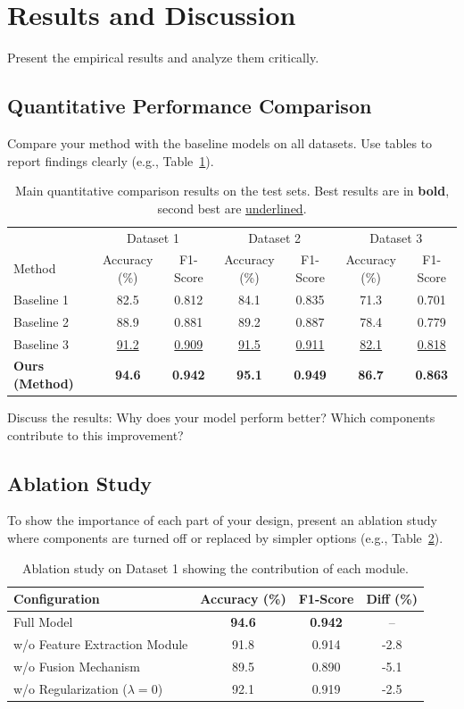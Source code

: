 \section{Results and Discussion}\label{sec:results}
Present the empirical results and analyze them critically.

\subsection{Quantitative Performance Comparison}
Compare your method with the baseline models on all datasets. Use tables to report findings clearly (e.g., Table~\ref{tab:main_results}).

\begin{table}[h]
\caption{Main quantitative comparison results on the test sets. Best results are in \textbf{bold}, second best are \underline{underlined}.}\label{tab:main_results}
\begin{tabular}{@{}lcccccc@{}}
\toprule
 & \multicolumn{2}{c}{Dataset 1} & \multicolumn{2}{c}{Dataset 2} & \multicolumn{2}{c}{Dataset 3} \\
Method & Accuracy (\%) & F1-Score & Accuracy (\%) & F1-Score & Accuracy (\%) & F1-Score \\
\midrule
Baseline 1 & 82.5 & 0.812 & 84.1 & 0.835 & 71.3 & 0.701 \\
Baseline 2 & 88.9 & 0.881 & 89.2 & 0.887 & 78.4 & 0.779 \\
Baseline 3 & \underline{91.2} & \underline{0.909} & \underline{91.5} & \underline{0.911} & \underline{82.1} & \underline{0.818} \\
\textbf{Ours (Method)} & \textbf{94.6} & \textbf{0.942} & \textbf{95.1} & \textbf{0.949} & \textbf{86.7} & \textbf{0.863} \\
\bottomrule
\end{tabular}
\end{table}

Discuss the results: Why does your model perform better? Which components contribute to this improvement?

\subsection{Ablation Study}
To show the importance of each part of your design, present an ablation study where components are turned off or replaced by simpler options (e.g., Table~\ref{tab:ablation}).

\begin{table}[h]
\caption{Ablation study on Dataset 1 showing the contribution of each module.}\label{tab:ablation}
\begin{tabular}{@{}lccc@{}}
\toprule
Configuration & Accuracy (\%) & F1-Score & Diff (\%) \\
\midrule
Full Model & \textbf{94.6} & \textbf{0.942} & -- \\
w/o Feature Extraction Module & 91.8 & 0.914 & -2.8 \\
w/o Fusion Mechanism & 89.5 & 0.890 & -5.1 \\
w/o Regularization ($\lambda = 0$) & 92.1 & 0.919 & -2.5 \\
\bottomrule
\end{tabular}
\end{table}


